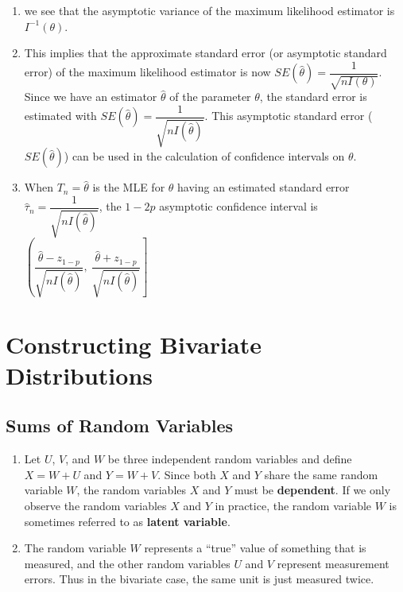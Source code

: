 \begin{enumerate}
    \item we see that the asymptotic variance of the maximum likelihood estimator is $I ^{-1}(\theta)$.
    \hfill \cite{statistics/book/Statistics-for-Data-Scientists/Maurits-Kaptein}

    \item This implies that the approximate standard error (or asymptotic standard error) of the maximum likelihood estimator is now $S E( \hat{\theta}) = \dfrac{1}{\sqrt{n I (\theta)}}$.
    Since we have an estimator $\hat{\theta}$ of the parameter $\theta$, the standard error is estimated with $\hat{SE}( \hat{\theta}) = \dfrac{1}{\sqrt{n I (\hat{\theta})}}$.
    This asymptotic standard error ($S E( \hat{\theta})$) can be used in the calculation of confidence intervals on $\theta$.
    \hfill \cite{statistics/book/Statistics-for-Data-Scientists/Maurits-Kaptein}

    \item When $T_n = \hat{\theta}$ is the MLE for $\theta$ having an estimated standard error $\hat{\tau}_n = \dfrac{1}{\sqrt{n I ( \hat{\theta})}}$, the $1 - 2 p$ asymptotic confidence interval is
    $
        \left(
        \dfrac{\hat{\theta} - z_{1-p}} {\sqrt{n I ( \hat{\theta})}},
        \ \dfrac{\hat{\theta} + z_{1-p}} {\sqrt{n I ( \hat{\theta})} }
        \right]
    $
    \hfill \cite{statistics/book/Statistics-for-Data-Scientists/Maurits-Kaptein}
\end{enumerate}












\section{Constructing Bivariate Distributions}

\subsection{Sums of Random Variables}

\begin{enumerate}
    \item Let $U$, $V$, and $W$ be three independent random variables and define $X = W + U$ and $Y = W + V$.
    Since both $X$ and $Y$ share the same random variable $W$, the random variables $X$ and $Y$ must be \textbf{dependent}.
    If we only observe the random variables $X$ and $Y$ in practice, the random variable $W$ is sometimes referred to as \textbf{latent variable}.
    \hfill \cite{statistics/book/Statistics-for-Data-Scientists/Maurits-Kaptein}

    \item The random variable $W$ represents a “true” value of something that is measured, and the other random variables $U$ and $V$ represent measurement errors.
    Thus in the bivariate case, the same unit is just measured twice.
    \hfill \cite{statistics/book/Statistics-for-Data-Scientists/Maurits-Kaptein}
\end{enumerate}


